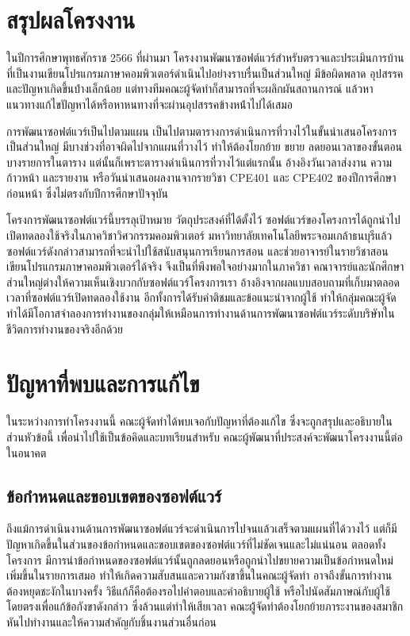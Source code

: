 \documentclass[12pt,one side,openright,a4paper]{cpe-thesis-th}
\newcommand{\thaijustify}[1]{%
  \par\hspace{30pt}\justifying
  #1
}
\begin{document}
\section{สรุปผลโครงงาน}
    \thaijustify{
        ในปีการศึกษาพุทธศักราช 2566 ที่ผ่านมา โครงงานพัฒนาซอฟต์แวร์สำหรับตรวจและประเมินการบ้านที่เป็นงานเขียนโปรแกรมภาษาคอมพิวเตอร์ดำเนินไปอย่างราบรื่นเป็นส่วนใหญ่ มีข้อผิดพลาด อุปสรรคและปัญหาเกิดขึ้นบ้่างเล็กน้อย แต่ทางทีมคณะผู้จัดทำก็สามารถที่จะผลิกผันสถานการณ์ แล้วหาแนวทางแก้ไขปัญหาได้หรือหาหนทางที่จะผ่านอุปสรรคข้างหน้่าไปได้เสมอ
    }
    \thaijustify{
        การพัฒนาซอฟต์แวร์เป็นไปตามแผน เป็นไปตามตารางการดำเนินการที่วางไว้ในขั้นนำเสนอโครงการเป็นส่วนใหญ่ มีบางช่วงที่อาจผิดไปจากแผนที่วางไว้ ทำให้ต้องโยกย้าย ขยาย ลดยอนเวลาของขั้นตอนบางรายการในตาราง แต่นั้นก็เพราะตารางดำเนินการที่วางไว้แต่แรกนั้น อ้างอิงวันเวลาส่งงาน ความก้าวหน้า และรายงาน หรือวันนำเสนอผลงานจากรายวิชา CPE401 และ CPE402 ของปีการศึกษาก่อนหน้า ซึ่งไม่ตรงกับปีการศีกษาปัจจุบัน
    }
    \thaijustify{
        โครงการพัฒนาซอฟต์แวร์นี้บรรลุเป้าหมาย วัตถุประสงค์ที่ได้ตั้งไว้ ซอฟต์แวร์ของโครงการได้ถูกนำไปเปิดทดลองใช้จริงในภาควิชาวิศวกรรมคอมพิวเตอร์ มหาวิทยาลัยเทคโนโลยีพระจอมเกล้าธนบุรีแล้ว ซอฟต์แวร์ดังกล่าวสามารถที่จะนำไปใช้สนับสนุนการเรียนการสอน และช่วยอาจารย์ในรายวิชาสอนเขียนโปรแกรมภาษาคอมพิวเตอร์ได้จริง จึงเป็นที่พึงพอใจอย่างมากในภาควิชา คณาจารย์และนักศึกษาส่วนใหญ่ต่างให้ความเห็นเชิงบวกกับซอฟต์แวร์โครงการเรา อ้างอิงจากผลแบบสอบถามที่เก็บมาตลอดเวลาที่ซอฟต์แวร์เปิดทดลองใช้งาน อีกทั้งการได้รับคำติชมและข้อแนะนำจากผู้ใช้ ทำให้กลุ่มคณะผู้จัดทำได้มีโอกาสจำลองการทำงานของกลุ่มให้เหมือนการทำงานด้านการพัฒนาซอฟต์แวร์ระดับบริษัทในชีวิตการทำงานของจริงอีกด้วย
    }
\section{ปัญหาที่พบและการแก้ไข}
    ในระหว่างการทำโครงงานนี้ คณะผู้จัดทำได้พบเจอกับปัญหาที่ต้องแก้ไข ซึ่งจะถูกสรุปและอธิบายในส่วนหัวข้อนี้ เพื่อนำไปใช้เป็นข้อคิดและบทเรียนสำหรับ คณะผู้พัฒนาที่ประสงค์จะพัฒนาโครงงานนี้ต่อในอนาคต
    \subsection{ข้อกำหนดและขอบเขตของซอฟต์แวร์}
        \thaijustify{
            ถึงแม้การดำเนินงานด้านการพัฒนาซอฟต์แวร์จะดำเนินการไปจนแล้วเสร็จตามแผนที่ได้วางไว้ แต่ก็มีปัญหาเกิดขึ้นในส่วนของข้อกำหนดและขอบเขตของซอฟต์แวร์ที่ไม่ชัดเจนและไม่แน่นอน ตลอดทั้งโครงการ มีการนำข้อกำหนดของซอฟต์แวร์นั้นถูกลดยอนหรือถูกนำไปขยายความเป็นข้อกำหนดใหม่เพิ่มขึ้นในรายการเสมอ ทำให้เกิดความสับสนและความกังขาขึ้นในคณะผู้จัดทำ อาจถึงขั้นการทำงานต้องหยุดชะงักในบางครั้ง วิธีแก้ก็คือต้องรอไปคำตอบและคำอธิบายผู้ใช้ หรือไปนัดสัมภาษณ์กับผู้ใช้โดยตรงเพื่อแก้ข้อกังขาดังกล่าว ซึ่งล้วนแต่ทำให้เสียเวลา คณะผู้้จัดทำต้องโยกย้ายภาระงานของสมาชิก หันไปทำงานและให้ความสำคัญกับชิ้นงานส่วนอื่นก่อน
        }
\end{document}
